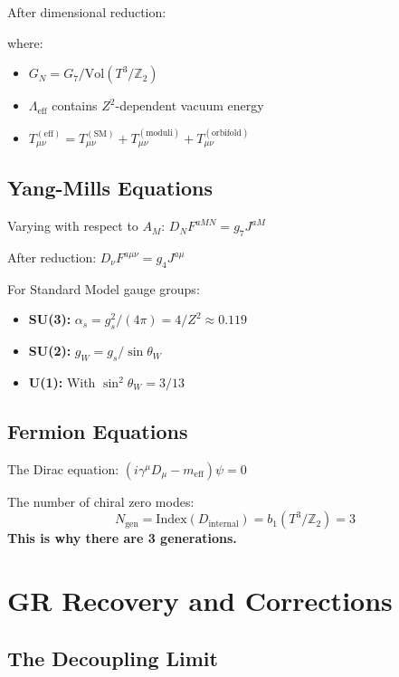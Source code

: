 \documentclass[11pt,a4paper]{article}
\theoremstyle{plain}
\theoremstyle{definition}
\theoremstyle{remark}
\newcommand{\Ngen}{N_{\text{gen}}}
\newcommand{\alphas}{\alpha_s}
\newcommand{\thetaW}{\theta_W}
\newcommand{\Ztwo}{\mathbb{Z}_2}
\begin{document}
After dimensional reduction:
\begin{center}
\end{center}

where:
\begin{itemize}
  \item $G_N = G_7 / \text{Vol}(T^3/\Ztwo)$
  \item $\Lambda_{\text{eff}}$ contains $Z^2$-dependent vacuum energy
  \item $T_{\mu\nu}^{(\text{eff})} = T_{\mu\nu}^{(\text{SM})} + T_{\mu\nu}^{(\text{moduli})} + T_{\mu\nu}^{(\text{orbifold})}$
\end{itemize}

\subsection{Yang-Mills Equations}

Varying with respect to $A_M$: $D_N F^{aMN} = g_7 J^{aM}$

After reduction: $D_\nu F^{a\mu\nu} = g_4 J^{a\mu}$

For Standard Model gauge groups:
\begin{itemize}
  \item \textbf{SU(3):} $\alphas = g_s^2/(4\pi) = 4/Z^2 \approx 0.119$
  \item \textbf{SU(2):} $g_W = g_s / \sin\thetaW$
  \item \textbf{U(1):} With $\sin^2\thetaW = 3/13$
\end{itemize}

\subsection{Fermion Equations}

The Dirac equation: $(i\gamma^\mu D_\mu - m_{\text{eff}})\psi = 0$

The number of chiral zero modes:
\[
\Ngen = \text{Index}(D_{\text{internal}}) = b_1(T^3/\Ztwo) = 3
\]
\textbf{This is why there are 3 generations.}

\section{GR Recovery and Corrections}

\subsection{The Decoupling Limit}
\end{document}

